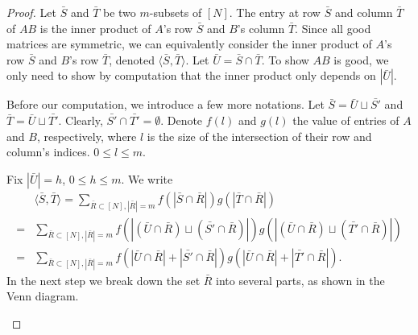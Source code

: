 \documentclass[10pt]{article}
\newenvironment{Proof of lemma}{\noindent{\bf Proof of Lemma}}{\hfill$\Box$\newline}
\newenvironment{Proof of claim}{\noindent{\bf Proof of claim}}{\hfill$\Box$\newline}
\newenvironment{Proof of theorem}{\noindent{\bf Proof of Theorem}}{\hfill\scriptsize{$\Box$}\newline}
\newenvironment{Proof of theorems}{\noindent{\bf Proof of Theorems}}{\hfill$\Box$\newline}
\newenvironment{Proof of proposition}{\noindent{\bf Proof of Proposition}}{\hfill$\Box$\newline}
\newenvironment{Proof of propositions}{\noindent{\bf Proof of Propositions}}{\hfill$\Box$\newline}
\newenvironment{Proof of exercise}{\noindent{\it Proof of Exercise:}}{\hfill$\Box$}
\numberwithin{equation}{section}
\begin{document}
\begin{proof}
    Let $\bar{S}$ and $\bar{T}$ be two $m$-subsets of $[N]$. The entry at row $\bar{S}$ and column $\bar{T}$ of $AB$ is the inner product of $A$'s row $\bar{S}$ and $B$'s column $\bar{T}$. Since all good matrices are symmetric, we can equivalently consider the inner product of $A$'s row $\bar{S}$ and $B$'s row $\bar{T}$, denoted $\langle \bar{S}, \bar{T} \rangle$. Let $\bar{U} = \bar{S} \cap \bar{T}$. To show $AB$ is good, we only need to show by computation that the inner product only depends on $|\bar{U}|$.

    Before our computation, we introduce a few more notations. Let $\bar{S} = \bar{U} \sqcup \bar{S'}$ and $\bar{T} = \bar{U} \sqcup \bar{T'}$. Clearly, $\bar{S'} \cap \bar{T'} = \emptyset$. Denote $f(l)$ and $g(l)$ the value of entries of $A$ and $B$, respectively, where $l$ is the size of the intersection of their row and column's indices. $0 \leq l \leq m$.

    Fix $|\bar{U}| = h$, $0 \leq h  \leq m$. We write
    \begin{align} \label{inverse_ip_1}
        &\langle \bar{S}, \bar{T} \rangle = \sum_{\bar{R} \subset [N], |\bar{R}|=m} f(|\bar{S} \cap \bar{R}|)g(|\bar{T} \cap \bar{R}|) \nonumber \\
        =&\sum_{\bar{R} \subset [N], |\bar{R}|=m} f(|(\bar{U} \cap \bar{R}) \sqcup (\bar{S'} \cap \bar{R})|)g(|(\bar{U} \cap \bar{R}) \sqcup (\bar{T'} \cap \bar{R})|) \nonumber \\
        =&\sum_{\bar{R} \subset [N], |\bar{R}|=m} f(|\bar{U} \cap \bar{R}|+|\bar{S'} \cap \bar{R}|)g(|\bar{U} \cap \bar{R}|+|\bar{T'} \cap \bar{R}|).
    \end{align}
    In the next step we break down the set $\bar{R}$ into several parts, as shown in the Venn diagram.

    \begin{center}
    \end{center}


\end{proof}
\end{document}

